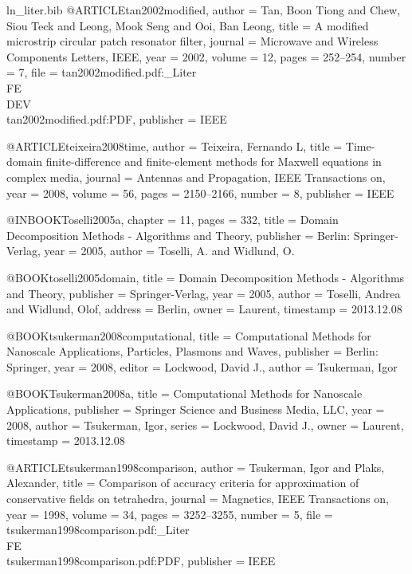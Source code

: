 \begin{filecontents*}{ln_liter.bib}
@ARTICLE{tan2002modified,
  author = {Tan, Boon Tiong and Chew, Siou Teck and Leong, Mook Seng and Ooi,
	Ban Leong},
  title = {A modified microstrip circular patch resonator filter},
  journal = {Microwave and Wireless Components Letters, IEEE},
  year = {2002},
  volume = {12},
  pages = {252--254},
  number = {7},
  file = {tan2002modified.pdf:_Liter\\FE\\DEV\\tan2002modified.pdf:PDF},
  publisher = {IEEE}
}

@ARTICLE{teixeira2008time,
  author = {Teixeira, Fernando L},
  title = {Time-domain finite-difference and finite-element methods for {{M}axwell}
	equations in complex media},
  journal = {Antennas and Propagation, IEEE Transactions on},
  year = {2008},
  volume = {56},
  pages = {2150--2166},
  number = {8},
  publisher = {IEEE}
}

@INBOOK{Toselli2005a,
  chapter = {11},
  pages = {332},
  title = {Domain Decomposition Methods - Algorithms and Theory},
  publisher = {Berlin: Springer-Verlag},
  year = {2005},
  author = {Toselli, A. and Widlund, O.}
}

@BOOK{toselli2005domain,
  title = {Domain Decomposition Methods - Algorithms and Theory},
  publisher = {Springer-Verlag},
  year = {2005},
  author = {Toselli, Andrea and Widlund, Olof},
  address = {Berlin},
  owner = {Laurent},
  timestamp = {2013.12.08}
}

@BOOK{tsukerman2008computational,
  title = {Computational Methods for Nanoscale Applications, Particles, Plasmons
	and Waves},
  publisher = {Berlin: Springer},
  year = {2008},
  editor = {Lockwood, David J.},
  author = {Tsukerman, Igor}
}

@BOOK{Tsukerman2008a,
  title = {Computational Methods for Nanoscale Applications},
  publisher = {Springer Science and Business Media, LLC},
  year = {2008},
  author = {Tsukerman, Igor},
  series = {Lockwood, David J.},
  owner = {Laurent},
  timestamp = {2013.12.08}
}

@ARTICLE{tsukerman1998comparison,
  author = {Tsukerman, Igor and Plaks, Alexander},
  title = {Comparison of accuracy criteria for approximation of conservative
	fields on tetrahedra},
  journal = {Magnetics, IEEE Transactions on},
  year = {1998},
  volume = {34},
  pages = {3252--3255},
  number = {5},
  file = {tsukerman1998comparison.pdf:_Liter\\FE\\tsukerman1998comparison.pdf:PDF},
  publisher = {IEEE}
}


\end{filecontents*}
